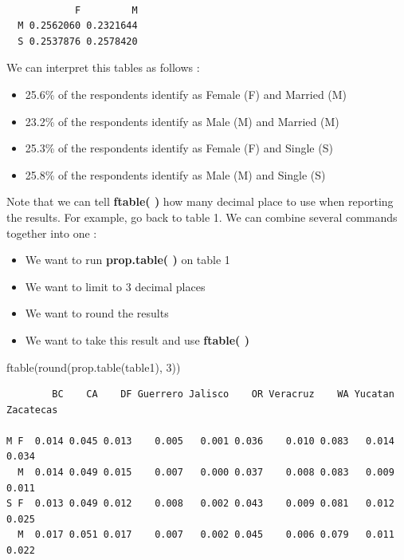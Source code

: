 \documentclass[
  letterpaper,
  DIV=11,
  numbers=noendperiod]{scrreprt}
\newenvironment{Shaded}{\begin{snugshade}}{\end{snugshade}}
\newcommand{\DecValTok}[1]{\textcolor[rgb]{0.68,0.00,0.00}{#1}}
\newcommand{\FunctionTok}[1]{\textcolor[rgb]{0.28,0.35,0.67}{#1}}
\newcommand{\NormalTok}[1]{\textcolor[rgb]{0.00,0.23,0.31}{#1}}
\providecommand{\tightlist}{%
  \setlength{\itemsep}{0pt}\setlength{\parskip}{0pt}}\usepackage{longtable,booktabs,array}
\begin{document}
\begin{verbatim}
   
            F         M
  M 0.2562060 0.2321644
  S 0.2537876 0.2578420
\end{verbatim}

We can interpret this tables as follows :

\begin{itemize}
\tightlist
\item
  25.6\% of the respondents identify as Female (F) and Married (M)
\item
  23.2\% of the respondents identify as Male (M) and Married (M)
\item
  25.3\% of the respondents identify as Female (F) and Single (S)
\item
  25.8\% of the respondents identify as Male (M) and Single (S)
\end{itemize}

Note that we can tell \textbf{ftable( )} how many decimal place to use
when reporting the results. For example, go back to table 1. We can
combine several commands together into one :

\begin{itemize}
\tightlist
\item
  We want to run \textbf{prop.table( )} on table 1
\item
  We want to limit to 3 decimal places
\item
  We want to round the results
\item
  We want to take this result and use \textbf{ftable( )}
\end{itemize}

\begin{Shaded}
\begin{Highlighting}[]
\FunctionTok{ftable}\NormalTok{(}\FunctionTok{round}\NormalTok{(}\FunctionTok{prop.table}\NormalTok{(table1), }\DecValTok{3}\NormalTok{))}
\end{Highlighting}
\end{Shaded}

\begin{verbatim}
        BC    CA    DF Guerrero Jalisco    OR Veracruz    WA Yucatan Zacatecas
                                                                              
M F  0.014 0.045 0.013    0.005   0.001 0.036    0.010 0.083   0.014     0.034
  M  0.014 0.049 0.015    0.007   0.000 0.037    0.008 0.083   0.009     0.011
S F  0.013 0.049 0.012    0.008   0.002 0.043    0.009 0.081   0.012     0.025
  M  0.017 0.051 0.017    0.007   0.002 0.045    0.006 0.079   0.011     0.022
\end{verbatim}
\end{document}
